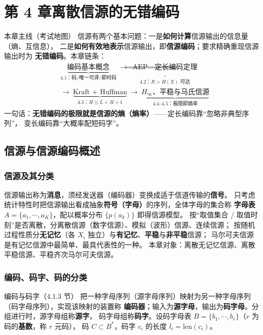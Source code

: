 \section{第 4 章\quad 离散信源的无错编码}

\begin{keypoint}{本章主线（考试地图）}
信源有两个基本问题：一是\textbf{如何计算}信源输出的信息量（熵、互信息），
二是\textbf{如何有效地表示}信源输出，即\textbf{信源编码}；要求精确重现信源输出时为
\textbf{无错编码}。本章链条：
\begin{align*}
&\underbrace{\text{编码基本概念}}_{\text{4.1：码/唯一可译/即时码}}
\ \longrightarrow\
\underbrace{\text{AEP}\Rightarrow\text{定长编码定理}}_{\text{4.2：}R>H(X)\text{ 可达}}\\[2pt]
&\longrightarrow\
\underbrace{\text{Kraft + Huffman}}_{\text{4.3：}H\le\bar L<H+1}
\ \longrightarrow\
\underbrace{H_\infty\text{、平稳与马氏信源}}_{\text{4.4--4.5：极限即熵率}}
\end{align*}
一句话：\textbf{无错编码的极限就是信源的熵（熵率）}——定长编码靠“忽略非典型序列”，
变长编码靠“大概率配短码字”。
\end{keypoint}

\subsection{信源与信源编码概述}

\subsubsection{信源及其分类}
信源输出称为\textbf{消息}，须经发送器（编码器）变换成适于信道传输的\textbf{信号}。
只考虑统计特性时把信源输出看成抽象\textbf{符号（字母）}的序列，全体字母的集合称
\textbf{字母表} $A=\{a_1,\cdots,a_K\}$，配以概率分布 $\{p(a_k)\}$ 即得信源模型。
按“取值集合 / 取值时刻”是否离散，分离散信源（数字信源）、模拟（波形）信源、连续信源；
按随机过程性质分\textbf{无记忆}（各 $X_i$ 独立）与\textbf{有记忆}、\textbf{平稳}与\textbf{非平稳}信源；
马尔可夫信源是有记忆信源中最简单、最具代表性的一种。
本章对象：离散无记忆信源、离散平稳信源、平稳齐次马尔可夫信源。

\subsubsection{编码、码字、码的分类}
\begin{defbox}{编码与码字（4.1.3 节）}
把一种字母序列（源字母序列）映射为另一种字母序列（码字母序列），实现该映射的装置称
\textbf{编码器}；输入为\textbf{源字母}，输出为\textbf{码字母}。分组进行时，源字母组称\textbf{源字}，
码字母组称\textbf{码字}。设码字母表 $B=\{b_1,\cdots,b_r\}$（$r$ 为码的\textbf{基数}，称 $r$ 元码），
码 $C\subset B^{*}$，码字 $c_i$ 的长度 $l_i=\mathrm{len}(c_i)$。
\end{defbox}

